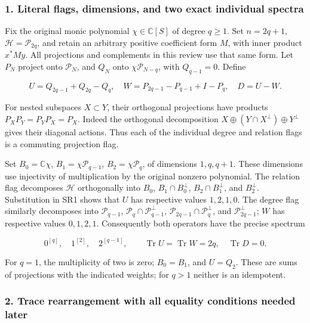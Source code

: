 \subsubsection{1. Literal flags, dimensions, and two exact individual spectra}\label{endpoint-four_window_sharpness_review--literal-flags-dimensions-and-two-exact-individual-spectra}

Fix the original monic polynomial \(\chi\in\mathbb C[S]\) of degree \(q\ge1\). Set \(n=2q+1\), \(\mathcal H=\mathcal P_{2q}\), and retain an arbitrary positive coefficient form \(M\), with inner product \(x^*My\). All projections and complements in this review use that same form. Let \(P_N\) project onto \(\mathcal P_N\), and \(Q_N\) onto \(\chi\mathcal P_{N-q}\), with \(Q_{q-1}=0\). Define

\[
U=Q_{2q-1}+Q_{2q}-Q_q,\quad
W=P_{2q-1}-P_{q-1}+I-P_q,\quad D=U-W.
\tag{SR1}
\]

For nested subspaces \(X\subset Y\), their orthogonal projections have products \(P_XP_Y=P_YP_X=P_X\). Indeed the orthogonal decomposition \(X\oplus(Y\cap X^\perp)\oplus Y^\perp\) gives their diagonal actions. Thus each of the individual degree and relation flags is a commuting projection flag.

Set \(B_0=\mathbb C\chi\), \(B_1=\chi\mathcal P_{q-1}\), \(B_2=\chi\mathcal P_q\), of dimensions \(1,q,q+1\). These dimensions use injectivity of multiplication by the original nonzero polynomial. The relation flag decomposes \(\mathcal H\) orthogonally into \(B_0\), \(B_1\cap B_0^\perp\), \(B_2\cap B_1^\perp\), and \(B_2^\perp\). Substitution in SR1 shows that \(U\) has respective values \(1,2,1,0\). The degree flag similarly decomposes into \(\mathcal P_{q-1}\), \(\mathcal P_q\cap\mathcal P_{q-1}^\perp\), \(\mathcal P_{2q-1}\cap\mathcal P_q^\perp\), and \(\mathcal P_{2q-1}^\perp\); \(W\) has respective values \(0,1,2,1\). Consequently both operators have the precise spectrum

\[
0^{[q]},\quad 1^{[2]},\quad 2^{[q-1]},
\qquad \operatorname{Tr}U=\operatorname{Tr}W=2q,\quad
\operatorname{Tr}D=0.
\tag{SR2}
\]

For \(q=1\), the multiplicity of two is zero; \(B_0=B_1\), and \(U=Q_2\). These are sums of projections with the indicated weights; for \(q>1\) neither is an idempotent.

\subsubsection{2. Trace rearrangement with all equality conditions needed later}\label{endpoint-four_window_sharpness_review--trace-rearrangement-with-all-equality-conditions-needed-later}


